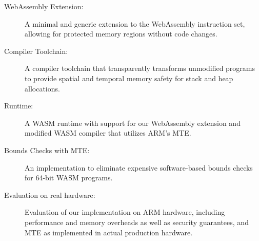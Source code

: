 \begin{description}
    \item[WebAssembly Extension:] A minimal and generic extension to the WebAssembly instruction set, allowing for protected memory regions without code changes.
    \item[Compiler Toolchain:] A compiler toolchain that transparently transforms unmodified programs to provide spatial and temporal memory safety for stack and heap allocations.
    \item[Runtime:] A \ac{WASM} runtime with support for our WebAssembly extension and modified \ac{WASM} compiler that utilizes ARM's \ac{MTE}.
    \item[Bounds Checks with \ac{MTE}:] An implementation to eliminate expensive software-based bounds checks for 64-bit \ac{WASM} programs.
    \item[Evaluation on real hardware:] Evaluation of our implementation on ARM hardware, including performance and memory overheads as well as security guarantees, and \ac{MTE} as implemented in actual production hardware.
\end{description}
